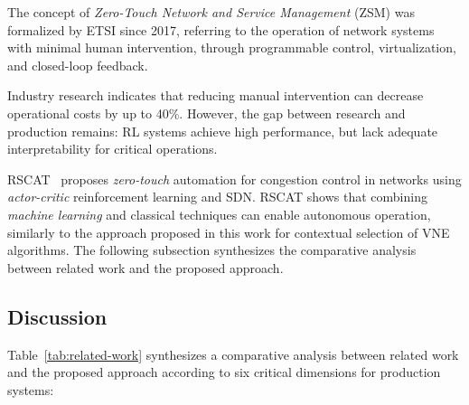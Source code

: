 \documentclass[runningheads]{llncs}
\begin{document}
The concept of \textit{Zero-Touch Network and Service Management} (ZSM) was formalized by ETSI since 2017, referring to the operation of network systems with minimal human intervention, through programmable control, virtualization, and closed-loop feedback.

Industry research indicates that reducing manual intervention can decrease operational costs by up to 40\%.
However, the gap between research and production remains: RL systems achieve high performance, but lack adequate interpretability for critical operations.

RSCAT~\cite{diel2023rscat} proposes \textit{zero-touch} automation for congestion control in networks using \textit{actor-critic} reinforcement learning and SDN.
RSCAT shows that combining \textit{machine learning} and classical techniques can enable autonomous operation, similarly to the approach proposed in this work for contextual selection of VNE algorithms. The following subsection synthesizes the comparative analysis between related work and the proposed approach.

\subsection{Discussion}
\label{subsec:discussion}

Table~\ref{tab:related-work} synthesizes a comparative analysis between related work and the proposed approach according to six critical dimensions for production systems:

\begin{table}[t]
\centering
\caption{Comparative Analysis: Related Work vs Proposed Approach (six critical dimensions)}
\label{tab:related-work}
\end{table}
\end{document}
